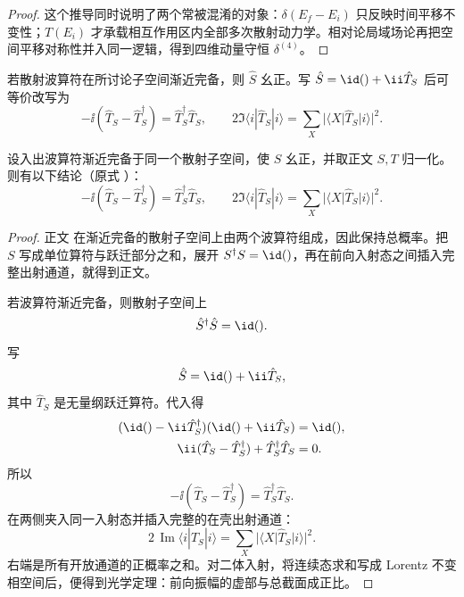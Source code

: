 \begin{proof}
这个推导同时说明了两个常被混淆的对象：\(\delta(E_f-E_i)\) 只反映时间平移不变性；\(T(E_i)\) 才承载相互作用区内全部多次散射动力学。相对论局域场论再把空间平移对称性并入同一逻辑，得到四维动量守恒 \(\delta^{(4)}\)。
\end{proof}
若散射波算符在所讨论子空间渐近完备，则 $\hat S$ 幺正。写 $\hat S=\id()+\ii\hat T_S$ 后可等价改写为
\begin{equation}
 \boxed{
 -\ii(\hat T_S-\hat T_S^\dagger)
 =\hat T_S^\dagger\hat T_S,
 \qquad
 2\Im\langle i|\hat T_S|i\rangle
 =\sum_X|\langle X|\hat T_S|i\rangle|^2.}
 \label{eq:optical-unitarity-r68}
\end{equation}

\begin{proposition}[散射矩阵的光学恒等式]
设入出波算符渐近完备于同一个散射子空间，使 $S$ 幺正，并取正文 $S,T$ 归一化。则有以下结论（原式 ）：
\begin{equation*}
 \boxed{
 -\ii(\hat T_S-\hat T_S^\dagger)
 =\hat T_S^\dagger\hat T_S,
 \qquad
 2\Im\langle i|\hat T_S|i\rangle
 =\sum_X|\langle X|\hat T_S|i\rangle|^2.}
\end{equation*}
\end{proposition}
\begin{proof}
正文 在渐近完备的散射子空间上由两个波算符组成，因此保持总概率。把 $S$ 写成单位算符与跃迁部分之和，展开 $S^\dagger S=\id()$，再在前向入射态之间插入完整出射通道，就得到正文。



若波算符渐近完备，则散射子空间上
\begin{equation*}
 \hat S^\dagger\hat S=\id().
\end{equation*}
写
\begin{equation*}
 \hat S=\id()+\ii\hat T_S,
\end{equation*}
其中 $\hat T_S$ 是无量纲跃迁算符。代入得
\begin{align*}
 (\id()-\ii\hat T_S^\dagger)
 (\id()+\ii\hat T_S)
 &=\id(),\\
 \ii(\hat T_S-\hat T_S^\dagger)
 +\hat T_S^\dagger\hat T_S
 &=0.
\end{align*}
所以
\begin{equation*}
 {
 -\ii(
 \hat T_S-\hat T_S^\dagger)
 =
 \hat T_S^\dagger\hat T_S.}
 \end{equation*}
在两侧夹入同一入射态并插入完整的在壳出射通道：
\begin{equation*}
 2\,\operatorname{Im}
 \langle i|\hat T_S|i\rangle
 =
 \sum_X
 |\langle X|\hat T_S|i\rangle|^2.
 \end{equation*}
右端是所有开放通道的正概率之和。对二体入射，将连续态求和写成 Lorentz 不变相空间后，便得到光学定理：前向振幅的虚部与总截面成正比。
\end{proof}


